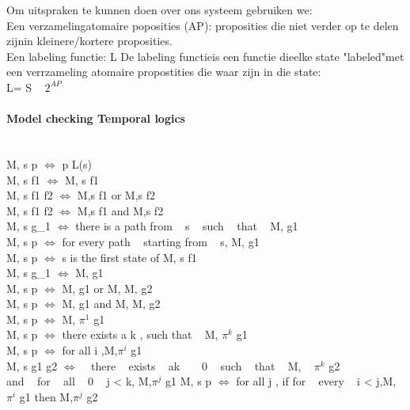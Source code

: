 \documentclass{article}
\begin{document}
 Om uitspraken te kunnen doen over ons systeem gebruiken we: \\
 Een verzamelingatomaire poposities (AP): proposities die niet verder op te delen zijnin kleinere/kortere proposities. \\
 Een labeling functie: L
 De labeling functieis een functie dieelke state "labeled"met een verrzameling atomaire propostities die waar zijn in die state: \\
   L= S \to   ~ $2^{AP}$  \\
 

 
 
 \paragraph{Model checking Temporal logics} 
 \newline \\
 M, s \models p $\Leftrightarrow$ p \in L(s) \\
 M, s \models \not f1 $\Leftrightarrow$ M, s \nvdash f1 \\
 M, s \models f1 \vee f2 $\Leftrightarrow$ M,s \models f1 or M,s \nvdash f2 \\
 M, s \models f1 \wedge f2 $\Leftrightarrow$  M,s \models f1 and M,s \nvdash f2 \\
 M, s \models {} g_{1} $\Leftrightarrow$ there is a path \pi  from ~  s ~   such ~  that  ~ M, \pi \models g1 \\
 M, s \models p $\Leftrightarrow$ for every path \pi  ~ starting from  ~  s, M, \pi \models g1 \\
 M, s \models p $\Leftrightarrow$ s is the first state of \piand M, s \models f1 \\
 M, s \models \not g_{1} $\Leftrightarrow$ M, \pi  \nvdash g1\\
 M, s \models p $\Leftrightarrow$  M, \pi  \models g1  or  M, \pi  M, \pi  \models g2\\
 M, s \models p $\Leftrightarrow$ M, \pi  \models g1  and  M, \pi  M, \pi  \models g2 \\
 M, s \models p $\Leftrightarrow$ M, $\pi^{1}$ \models g1 \\
 M, s \models p $\Leftrightarrow$ there exists a k , such that  ~ M, $\pi^{k}$  \models g1\\
 M, s \models p $\Leftrightarrow$ for all i ,M,$\pi^{i}$ \models g1 \\
 M, s \models g1 \bugcup g2 $\Leftrightarrow$ ~  there  ~ exists  ~ ak  ~ \ge  ~ 0 ~  such ~  that  ~ M,  ~ $\pi^{k}$ \models g2\\
 and  ~ for  ~ all ~  0  ~ \le j < k, M,$\pi^{j}$ \models g1
 M, s \models p $\Leftrightarrow$ for all j , if for ~  every  ~ i < j,M,$\pi^{i}$ \nvdash g1 then M,$\pi^{j}$ \models g2\\
 
\end{document}
